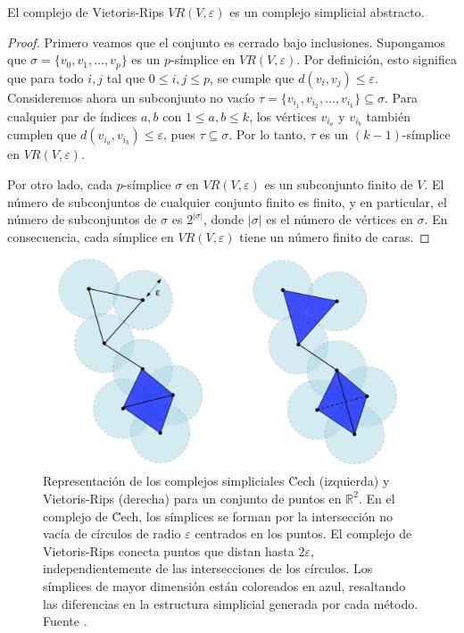 \begin{proposicion}
	El complejo de Vietoris-Rips \(VR(V,\varepsilon)\) es un complejo simplicial abstracto.
\end{proposicion}

\begin{proof}
	Primero veamos que el conjunto es cerrado bajo inclusiones. Supongamos que $\sigma = \{v_0, v_1, \dots, v_p\}$ es un $p$-símplice en $VR(V, \varepsilon)$. Por definición, esto significa que para todo $i, j$ tal que $0 \leq i, j \leq p$, se cumple que $d(v_i, v_j) \leq \varepsilon$. Consideremos ahora un subconjunto no vacío $\tau = \{v_{i_1}, v_{i_2}, \dots, v_{i_k}\} \subseteq \sigma$. Para cualquier par de índices $a, b$ con $1 \leq a, b \leq k$, los vértices $v_{i_a}$ y $v_{i_b}$ también cumplen que $d(v_{i_a}, v_{i_b}) \leq \varepsilon$, pues $\tau \subseteq \sigma$. Por lo tanto, $\tau$ es un $(k-1)$-símplice en $VR(V, \varepsilon)$.
	
	Por otro lado, cada $p$-símplice $\sigma$ en $VR(V, \varepsilon)$ es un subconjunto finito de $V$. El número de subconjuntos de cualquier conjunto finito es finito, y en particular, el número de subconjuntos de $\sigma$ es $2^{|\sigma|}$, donde $|\sigma|$ es el número de vértices en $\sigma$. En consecuencia, cada símplice en $VR(V, \varepsilon)$ tiene un número finito de caras.
\end{proof}

\begin{figure}
	\centering
	\includegraphics[width=110mm]{img/cech-vr.png}
	\caption{Representación de los complejos simpliciales \u Cech (izquierda) y Vietoris-Rips (derecha) para un conjunto de puntos en \( \mathbb{R}^2 \). En el complejo de \u Cech, los símplices se forman por la intersección no vacía de círculos de radio \(\varepsilon\) centrados en los puntos. El complejo de Vietoris-Rips conecta puntos que distan hasta \(2\varepsilon\), independientemente de las intersecciones de los círculos. Los símplices de mayor dimensión están coloreados en azul, resaltando las diferencias en la estructura simplicial generada por cada método. Fuente \cite{chazal2021introduction}.}
\end{figure}

